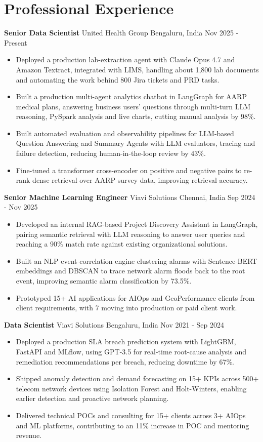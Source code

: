 \documentclass[10pt,a4paper]{article}
\newcommand{\role}[4]{\textbf{#1} \textbar{} #2 \hfill #3 \textbar{} #4\par}
\begin{document}
\section{Professional Experience}
\role{Senior Data Scientist}{United Health Group}{Bengaluru, India}{Nov 2025 - Present}
\begin{itemize}
  \item Deployed a production lab-extraction agent with Claude Opus 4.7 and Amazon Textract, integrated with LIMS, handling about 1,800 lab documents and automating the work behind 800 Jira tickets and PRD tasks.
  \item Built a production multi-agent analytics chatbot in LangGraph for AARP medical plans, answering business users' questions through multi-turn LLM reasoning, PySpark analysis and live charts, cutting manual analysis by 98\%.
  \item Built automated evaluation and observability pipelines for LLM-based Question Answering and Summary Agents with LLM evaluators, tracing and failure detection, reducing human-in-the-loop review by 43\%.
  \item Fine-tuned a transformer cross-encoder on positive and negative pairs to re-rank dense retrieval over AARP survey data, improving retrieval accuracy.
\end{itemize}
\vspace{3pt}
\role{Senior Machine Learning Engineer}{Viavi Solutions}{Chennai, India}{Sep 2024 - Nov 2025}
\begin{itemize}
  \item Developed an internal RAG-based Project Discovery Assistant in LangGraph, pairing semantic retrieval with LLM reasoning to answer user queries and reaching a 90\% match rate against existing organizational solutions.
  \item Built an NLP event-correlation engine clustering alarms with Sentence-BERT embeddings and DBSCAN to trace network alarm floods back to the root event, improving semantic alarm classification by 73.5\%.
  \item Prototyped 15+ AI applications for AIOps and GeoPerformance clients from client requirements, with 7 moving into production or paid client work.
\end{itemize}
\vspace{3pt}
\role{Data Scientist}{Viavi Solutions}{Bengaluru, India}{Nov 2021 - Sep 2024}
\begin{itemize}
  \item Deployed a production SLA breach prediction system with LightGBM, FastAPI and MLflow, using GPT-3.5 for real-time root-cause analysis and remediation recommendations per breach, reducing downtime by 67\%.
  \item Shipped anomaly detection and demand forecasting on 15+ KPIs across 500+ telecom network devices using Isolation Forest and Holt-Winters, enabling earlier detection and proactive network planning.
  \item Delivered technical POCs and consulting for 15+ clients across 3+ AIOps and ML platforms, contributing to an 11\% increase in POC and mentoring revenue.
\end{itemize}
\end{document}
